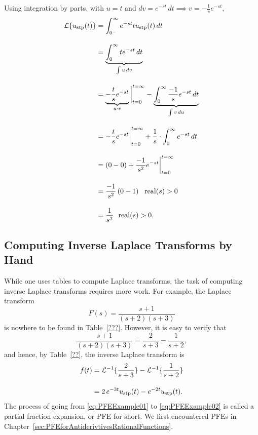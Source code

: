 \begin{enumerate}
    Using integration by parts, with $u=t$ and $dv =  e^{-st} \, dt \implies v = -\frac{1}{s}  e^{-st}$,
    \begin{align*}
    {\cal L}\{u_{\rm stp}(t) \} &= \int_{0^-}^\infty e^{-st} t u_{\rm stp}(t) \, dt\\[1em]
    & = \underbrace{ \int_{0}^\infty t e^{-st} \, dt}_{\int u \, dv}  \\[1em]
    & = \underbrace{-\frac{t}{s}e^{-st}}_{u \cdot v}\bigg|_{t = 0}^{t = \infty} -  \underbrace{\int_{0}^\infty \frac{-1}{s} e^{-st} \, dt}_{\int v \, du} \\[1em]   
    & = -\frac{t}{s}e^{-st}\bigg|_{t = 0}^{t = \infty} + \frac{1}{s} \cdot\int_{0}^\infty  e^{-st} \, dt \\[1em]  
    & = ( 0 - 0) + \frac{-1}{s^2} e^{-st}\bigg|_{t = 0}^{t = \infty} \\[1em]
    & = \frac{-1}{s^2} \left( 0 - 1  \right) ~~{\rm real}(s)>0 \\[1em]
    & = \frac{1}{s^2} ~~{\rm real}(s)>0.
\end{align*}
\end{enumerate}

\Qed



\subsection{Computing Inverse Laplace Transforms by Hand}

While one uses tables to compute Laplace transforms, the task of computing inverse Laplace transforms requires more work. For example, the Laplace transform
\begin{equation}
\label{eq:PFEExample01}
    F(s) = \frac{s+1}{(s+2)(s+3)}
\end{equation}
is nowhere to be found in Table~\ref{???}. However, it is easy to verify that
\begin{equation}
\label{eq:PFEExample02}
    \frac{s+1}{(s+2)(s+3)} = \frac{2}{s+3} - \frac{1}{s+2},
\end{equation}
and hence, by Table~\ref{??}, the inverse Laplace transform is
\begin{equation}
\begin{aligned} 
   f(t) &= {\cal L}^{-1} \{\frac{2}{s+3}\} - {\cal L}^{-1} \{\frac{1}{s+2} \} \\[1em]
   & = 2 \, e^{-3t} u_{\rm stp}(t) - e^{-2t} u_{\rm stp}(t).
   \end{aligned}
\end{equation}
The process of going from \eqref{eq:PFEExample01} to \eqref{eq:PFEExample02} is called a partial fraction expansion, or PFE for short. We first encountered PFEs in Chapter~\ref{sec:PFEforAntiderivtivesRationalFunctions}.

